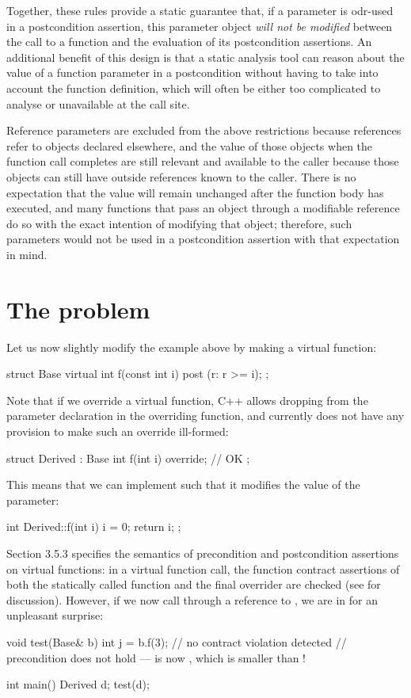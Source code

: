 Together, these rules provide a static guarantee that, if a parameter is odr-used in a postcondition assertion, this parameter object \emph{will not be modified} between the call to a function and the evaluation of its postcondition assertions. An additional benefit of this design is that a static analysis tool can reason about the value of a function parameter in a postcondition without having to  take into account the function definition, which will often be either too complicated to analyse or unavailable at the call site.

Reference parameters are excluded from the above restrictions because references refer to objects declared elsewhere, and the value of those objects when the function call completes are still relevant and available to the caller because those objects can still have outside references known to the caller.  
There is no expectation that the value will remain unchanged after the function body has executed, and many functions that pass an object through a modifiable reference do so with the exact intention of modifying that object; therefore, such parameters would not be used in a postcondition assertion with that expectation in mind.

\section{The problem}

Let us now slightly modify the example above by making  a virtual function:
\begin{codeblock}
struct Base {
  virtual int f(const int i) post (r: r >= i);
};
\end{codeblock}
Note that if we override a virtual function, C++ allows dropping  from the parameter declaration in the overriding function, and \cite{P2900R10} currently does not have any provision to make such an override ill-formed:
\begin{codeblock}
struct Derived : Base {
  int f(int i) override; // OK
};
\end{codeblock}
This means that we can implement  such that it modifies the value of the parameter:
\begin{codeblock}
int Derived::f(int i) {
  i = 0;
  return i;
};
\end{codeblock}
\cite{P2900R10} Section 3.5.3 specifies the semantics of precondition and postcondition assertions on virtual functions: in a virtual function call, the function contract assertions of both the statically called function  and the final overrider  are checked (see \cite{P3097R0} for discussion). However, if we now call  through a reference to , we are in for an unpleasant surprise:
\begin{codeblock}
void test(Base& b) {
  int j = b.f(3);  // no contract violation detected
  // precondition does not hold ---  is now , which is smaller than !
}

int main() {
  Derived d;
  test(d);
}
\end{codeblock}

